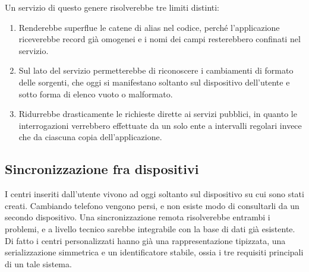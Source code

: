 Un servizio di questo genere risolverebbe tre limiti distinti:

\begin{enumerate}
    \item Renderebbe superflue le catene di alias nel codice, perché l'applicazione riceverebbe record già omogenei e
    i nomi dei campi resterebbero confinati nel servizio.
    \item Sul lato del servizio permetterebbe di riconoscere i cambiamenti di formato delle sorgenti, che oggi si manifestano soltanto
    sul dispositivo dell'utente e sotto forma di elenco vuoto o malformato.
    \item Ridurrebbe drasticamente le richieste dirette ai servizi pubblici, in quanto le interrogazioni verrebbero effettuate da
    un solo ente a intervalli regolari invece che da ciascuna copia dell'applicazione.
\end{enumerate}





\subsection{Sincronizzazione fra dispositivi}\label{subsec:futuro-cloud}

I centri inseriti dall'utente vivono ad oggi soltanto sul dispositivo su cui sono stati creati.
Cambiando telefono vengono persi, e non esiste modo di consultarli da un secondo dispositivo.
Una sincronizzazione remota risolverebbe entrambi i problemi, e a livello tecnico sarebbe integrabile con la base di dati
già esistente.
Di fatto i centri personalizzati hanno già una rappresentazione tipizzata, una serializzazione simmetrica
e un identificatore stabile, ossia i tre requisiti principali di un tale sistema.

